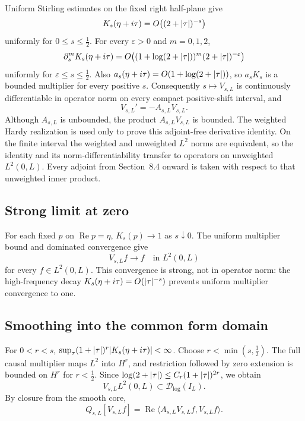 \documentclass[11pt,a4paper]{article}
\newcommand{\Dlog}{\mathcal D_{\log}}
\renewcommand{\Re}{\operatorname{Re}}
\newcommand{\eps}{\varepsilon}
\DeclarePairedDelimiter{\abs}{\lvert}{\rvert}
\theoremstyle{plain}
\theoremstyle{definition}
\numberwithin{equation}{section}
\begin{document}
Uniform Stirling estimates on the fixed right half-plane give
\begin{equation}
K_s(\eta+i\tau)=O\bigl((2+\abs\tau)^{-s}\bigr)
\end{equation}
uniformly for $0\le s\le\tfrac12$. For every $\eps>0$ and $m=0,1,2$,
\begin{equation}
\partial_s^mK_s(\eta+i\tau)=O\bigl((1+\log(2+\abs\tau))^m(2+\abs\tau)^{-\eps}\bigr)
\end{equation}
uniformly for $\eps\le s\le\tfrac12$. Also
$a_s(\eta+i\tau)=O(1+\log(2+\abs\tau))$, so $a_sK_s$ is a bounded multiplier
for every positive $s$. Consequently $s\mapsto V_{s,L}$ is continuously
differentiable in operator norm on every compact positive-shift interval, and
\begin{equation}\label{eq:V-prime}
V_{s,L}'=-A_{s,L}V_{s,L}.
\end{equation}
Although $A_{s,L}$ is unbounded, the product $A_{s,L}V_{s,L}$ is bounded. The
weighted Hardy realization is used only to prove this adjoint-free derivative
identity. On the finite interval the weighted and unweighted $L^2$ norms are
equivalent, so the identity and its norm-differentiability transfer to
operators on unweighted $L^2(0,L)$. Every adjoint from Section~8.4 onward is
taken with respect to that unweighted inner product.

\subsection{Strong limit at zero}

For each fixed $p$ on $\Re p=\eta$, $K_s(p)\to1$ as $s\downarrow0$. The
uniform multiplier bound and dominated convergence give
\begin{equation}\label{eq:strong-limit}
V_{s,L}f\longrightarrow f\quad\text{in }L^2(0,L)
\end{equation}
for every $f\in L^2(0,L)$. This convergence is strong, not in operator norm:
the high-frequency decay $K_s(\eta+i\tau)=O(\abs\tau^{-s})$ prevents uniform
multiplier convergence to one.

\subsection{Smoothing into the common form domain}

For $0<r<s$, $\sup_\tau(1+\abs\tau)^r\abs{K_s(\eta+i\tau)}<\infty$. Choose
$r<\min(s,\tfrac12)$. The full causal multiplier maps $L^2$ into $H^r$, and
restriction followed by zero extension is bounded on $H^r$ for $r<\tfrac12$.
Since $\log(2+\abs\tau)\le C_r(1+\abs\tau)^{2r}$, we obtain
\begin{equation}
V_{s,L}L^2(0,L)\subset\Dlog(I_L).
\end{equation}
By closure from the smooth core,
\begin{equation}\label{eq:Q-pairing}
Q_{s,L}[V_{s,L}f]=\Re\langle A_{s,L}V_{s,L}f,V_{s,L}f\rangle .
\end{equation}
\end{document}
